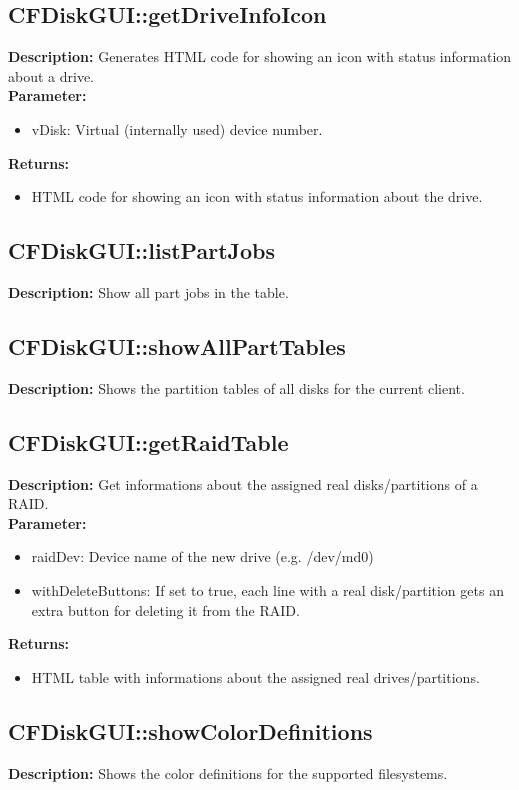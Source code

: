 \subsection{CFDiskGUI::getDriveInfoIcon}
\textbf{Description:} Generates HTML code for showing an icon with status information about a drive.\\
\textbf{Parameter:}
\begin{itemize}
\item vDisk: Virtual (internally used) device number.
\end{itemize}
\textbf{Returns:}
\begin{itemize}
\item HTML code for showing an icon with status information about the drive.
\end{itemize}

\subsection{CFDiskGUI::listPartJobs}
\textbf{Description:} Show all part jobs in the table.\\

\subsection{CFDiskGUI::showAllPartTables}
\textbf{Description:} Shows the partition tables of all disks for the current client.\\

\subsection{CFDiskGUI::getRaidTable}
\textbf{Description:} Get informations about the assigned real disks/partitions of a RAID.\\
\textbf{Parameter:}
\begin{itemize}
\item raidDev: Device name of the new drive (e.g. /dev/md0)
\item withDeleteButtons: If set to true, each line with a real disk/partition gets an extra button for deleting it from the RAID.
\end{itemize}
\textbf{Returns:}
\begin{itemize}
\item HTML table with informations about the assigned real drives/partitions.
\end{itemize}

\subsection{CFDiskGUI::showColorDefinitions}
\textbf{Description:} Shows the color definitions for the supported filesystems.\\

